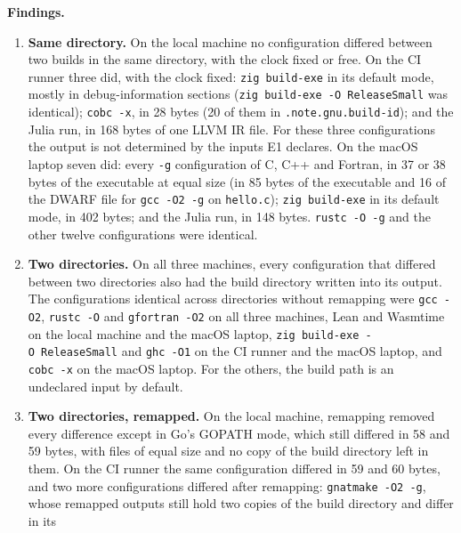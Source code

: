\documentclass[10pt,letterpaper]{article}
\providecommand{\tightlist}{\setlength{\itemsep}{1pt}\setlength{\parskip}{0pt}}
\begin{document}
\textbf{Findings.}

\begin{enumerate}
\def\labelenumi{\arabic{enumi}.}
\tightlist
\item
  \textbf{Same directory.} On the local machine no configuration
  differed between two builds in the same directory, with the clock
  fixed or free. On the CI runner three did, with the clock fixed:
  \texttt{zig\ build-\allowbreak{}exe} in its default mode, mostly in
  debug-information sections (\texttt{zig\ build-\allowbreak{}exe\ -\allowbreak{}O\ ReleaseSmall}
  was identical); \texttt{cobc\ -x}, in 28 bytes (20 of them in
  \texttt{.\allowbreak{}note.\allowbreak{}gnu.\allowbreak{}build-\allowbreak{}id}); and the Julia run, in 168 bytes of one
  LLVM IR file. For these three configurations the output is not
  determined by the inputs E1 declares. On the macOS laptop seven did:
  every \texttt{-g} configuration of C, C++ and Fortran, in 37 or 38
  bytes of the executable at equal size (in 85 bytes of the executable
  and 16 of the DWARF file for \texttt{gcc\ -\allowbreak{}O2\ -\allowbreak{}g} on
  \texttt{hello.c}); \texttt{zig\ build-\allowbreak{}exe} in its default mode, in 402
  bytes; and the Julia run, in 148 bytes. \texttt{rustc\ -\allowbreak{}O\ -\allowbreak{}g} and the
  other twelve configurations were identical.
\item
  \textbf{Two directories.} On all three machines, every configuration
  that differed between two directories also had the build directory
  written into its output. The configurations identical across
  directories without remapping were \texttt{gcc\ -O2},
  \texttt{rustc\ -O} and \texttt{gfortran\ -\allowbreak{}O2} on all three machines,
  Lean and Wasmtime on the local machine and the macOS laptop,
  \texttt{zig\ build-\allowbreak{}exe\ -\allowbreak{}O\ ReleaseSmall} and \texttt{ghc\ -O1} on the
  CI runner and the macOS laptop, and \texttt{cobc\ -x} on the macOS
  laptop. For the others, the build path is an undeclared input by
  default.
\item
  \textbf{Two directories, remapped.} On the local machine, remapping
  removed every difference except in Go's GOPATH mode, which still
  differed in 58 and 59 bytes, with files of equal size and no copy of
  the build directory left in them. On the CI runner the same
  configuration differed in 59 and 60 bytes, and two more configurations
  differed after remapping: \texttt{gnatmake\ -\allowbreak{}O2\ -\allowbreak{}g}, whose remapped
  outputs still hold two copies of the build directory and differ in its

\end{enumerate}
\end{document}
